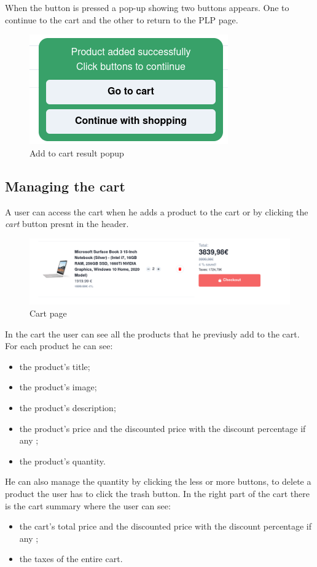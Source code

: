 When the button is pressed a pop-up showing two buttons appears. One to continue to the cart and the other to return to the PLP page.
\begin{figure}[!ht]
    \caption{Add to cart result popup}
    \vspace{10px}
    \includegraphics[scale=0.3]{../../../../Images/userManual/cartResult.png}
    \centering
\end{figure}
\newpage
\subsection{Managing the cart}
A user can access the cart when he adds a product to the cart or by clicking the \textit{cart} button presnt in the header.
\begin{figure}[!ht]
    \caption{Cart page}
    \vspace{10px}
    \includegraphics[scale=0.3]{../../../../Images/userManual/cart.png}
    \centering
\end{figure}
In the cart the user can see all the products that he previusly add to the cart. For each product he can see:
\begin{itemize}
    \item the product's title;
    \item the product's image;
    \item the product's description;
    \item the product's price and the discounted price with the discount percentage if any ;
    \item the product's quantity.
\end{itemize}
He can also manage the quantity by clicking the less or more buttons, to delete a product the user has to click the trash button. In the right part of the cart there is the cart summary where the user can see:
\begin{itemize}
    \item the cart's total price and the discounted price with the discount percentage if any ;
    \item the taxes of the entire cart.
\end{itemize}

